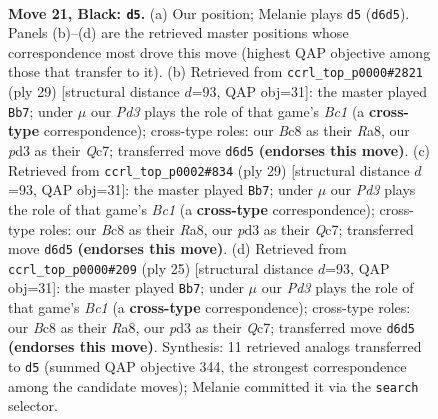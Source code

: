 \documentclass[11pt]{article}
\begin{document}
\clearpage

\begin{figure}[p]\centering
\begin{subfigure}{0.46\textwidth}\centering
\resizebox{\linewidth}{!}{%
\newchessgame
\chessboard[
  setfen={2bqnkr1/r3bp2/p2p2p1/n1p1p2p/PB2P3/3PQ2N/BPP2PPP/RN2R1K1 b - - 0 21},
  showmover=false,
  pgfstyle=straightmove, color=movearrow, markmove={d6-d5}
]}
\caption{}
\end{subfigure}\hfill
\begin{subfigure}{0.46\textwidth}\centering
\resizebox{\linewidth}{!}{%
\newchessgame
\chessboard[
  setfen={r1b2rk1/2q1bppp/p2ppn2/1p6/3BPP2/P1N3Q1/1PP1B1PP/R4RK1 b - - 0 15},
  showmover=false,
  pgfstyle=straightmove, color=movearrow, markmove={c8-b7}
]}
\caption{}
\end{subfigure}
\\[4pt]
\begin{subfigure}{0.46\textwidth}\centering
\resizebox{\linewidth}{!}{%
\newchessgame
\chessboard[
  setfen={r1b2rk1/2q1bppp/p2ppn2/1p6/3BPP2/P1N3Q1/1PP1B1PP/R4RK1 b - - 0 15},
  showmover=false,
  pgfstyle=straightmove, color=movearrow, markmove={c8-b7}
]}
\caption{}
\end{subfigure}\hfill
\begin{subfigure}{0.46\textwidth}\centering
\resizebox{\linewidth}{!}{%
\newchessgame
\chessboard[
  setfen={r1b2rk1/2q1bppp/p2ppn2/1p6/3BPP2/P1N3Q1/1PP1B1PP/R4RK1 b - - 0 13},
  showmover=false,
  pgfstyle=straightmove, color=movearrow, markmove={c8-b7}
]}
\caption{}
\end{subfigure}
\caption{\textbf{Move 21, Black: \texttt{d5}.} (a) Our position; Melanie plays \texttt{d5} (\texttt{d6d5}). Panels (b)--(d) are the retrieved master positions whose correspondence most drove this move (highest QAP objective among those that transfer to it). (b) Retrieved from \texttt{ccrl\_top\_p0000\#2821} (ply 29) [structural distance $d$=93, QAP obj=31]: the master played \texttt{Bb7}; under $\mu$ our \emph{Pd3} plays the role of that game's \emph{Bc1} (a \textbf{cross-type} correspondence); cross-type roles: our \emph{B}c8 as their \emph{R}a8, our \emph{p}d3 as their \emph{Q}c7; transferred move \texttt{d6d5} \textbf{(endorses this move)}. (c) Retrieved from \texttt{ccrl\_top\_p0002\#834} (ply 29) [structural distance $d$=93, QAP obj=31]: the master played \texttt{Bb7}; under $\mu$ our \emph{Pd3} plays the role of that game's \emph{Bc1} (a \textbf{cross-type} correspondence); cross-type roles: our \emph{B}c8 as their \emph{R}a8, our \emph{p}d3 as their \emph{Q}c7; transferred move \texttt{d6d5} \textbf{(endorses this move)}. (d) Retrieved from \texttt{ccrl\_top\_p0000\#209} (ply 25) [structural distance $d$=93, QAP obj=31]: the master played \texttt{Bb7}; under $\mu$ our \emph{Pd3} plays the role of that game's \emph{Bc1} (a \textbf{cross-type} correspondence); cross-type roles: our \emph{B}c8 as their \emph{R}a8, our \emph{p}d3 as their \emph{Q}c7; transferred move \texttt{d6d5} \textbf{(endorses this move)}. Synthesis: 11 retrieved analogs transferred to \texttt{d5} (summed QAP objective 344, the strongest correspondence among the candidate moves); Melanie committed it via the \texttt{search} selector.}
\label{fig:thought-m41}
\end{figure}
\end{document}

